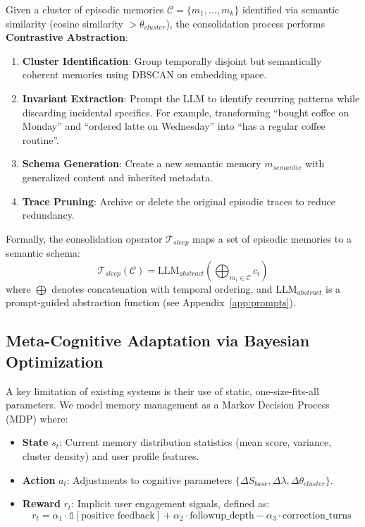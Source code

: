 Given a cluster of episodic memories $\mathcal{C} = \{m_1, \dots, m_k\}$ identified via semantic similarity (cosine similarity $> \theta_{cluster}$), the consolidation process performs \textbf{Contrastive Abstraction}:
\begin{enumerate}
    \item \textbf{Cluster Identification}: Group temporally disjoint but semantically coherent memories using DBSCAN on embedding space.
    \item \textbf{Invariant Extraction}: Prompt the LLM to identify recurring patterns while discarding incidental specifics. For example, transforming ``bought coffee on Monday'' and ``ordered latte on Wednesday'' into ``has a regular coffee routine''.
    \item \textbf{Schema Generation}: Create a new semantic memory $m_{semantic}$ with generalized content and inherited metadata.
    \item \textbf{Trace Pruning}: Archive or delete the original episodic traces to reduce redundancy.
\end{enumerate}

Formally, the consolidation operator $\mathcal{T}_{sleep}$ maps a set of episodic memories to a semantic schema:
\begin{equation}
    \mathcal{T}_{sleep}(\mathcal{C}) = \text{LLM}_{abstract}\left(\bigoplus_{m_i \in \mathcal{C}} c_i\right)
\end{equation}
where $\bigoplus$ denotes concatenation with temporal ordering, and $\text{LLM}_{abstract}$ is a prompt-guided abstraction function (see Appendix~\ref{app:prompts}).

\subsection{Meta-Cognitive Adaptation via Bayesian Optimization}
\label{subsec:meta_learning}

A key limitation of existing systems is their use of static, one-size-fits-all parameters. We model memory management as a Markov Decision Process (MDP) where:
\begin{itemize}
    \item \textbf{State} $s_t$: Current memory distribution statistics (mean score, variance, cluster density) and user profile features.
    \item \textbf{Action} $a_t$: Adjustments to cognitive parameters $\{\Delta S_{base}, \Delta \lambda, \Delta \theta_{cluster}\}$.
    \item \textbf{Reward} $r_t$: Implicit user engagement signals, defined as:
    \begin{equation}
        r_t = \alpha_1 \cdot \mathbb{1}[\text{positive feedback}] + \alpha_2 \cdot \text{followup\_depth} - \alpha_3 \cdot \text{correction\_turns}
    \end{equation}
\end{itemize}

